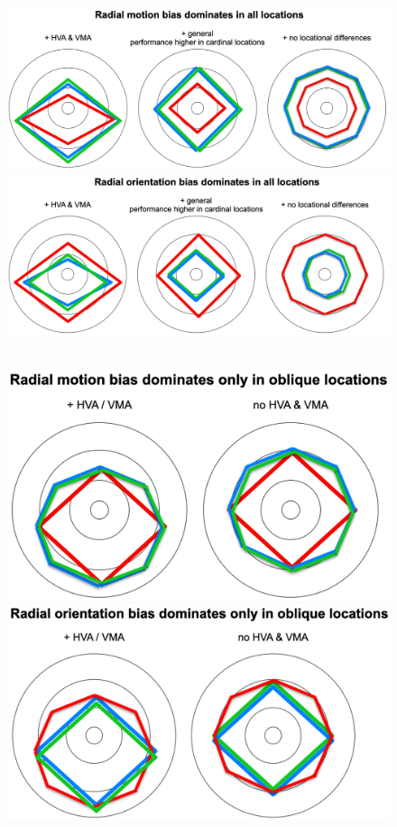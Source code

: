 \documentclass[11pt]{article} %
\begin{document}
	\begin{figure}[H]
	\centering %
	\includegraphics[scale=.25]{Images/Cartoon2.png}
	\includegraphics[scale=.25]{Images/Cartoon3.png}
	\end{figure}
	\begin{figure}[H]
	\centering %
	\includegraphics[scale=.25]{Images/Cartoon4.png}
	\includegraphics[scale=.25]{Images/Cartoon5.png}
	\includegraphics[scale=.25]{Images/Cartoon6.png}
	\end{figure}
	
\end{document}

